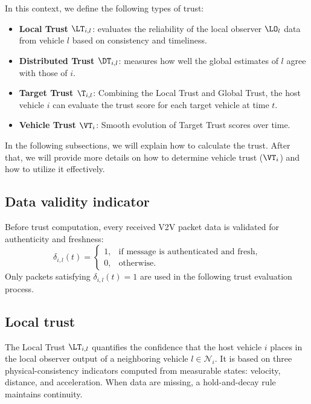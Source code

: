 In this context, we define the following types of trust:
\begin{itemize}
    \item \textbf{Local Trust $\LT_{i,l}$}: evaluates the reliability of the local observer $\LO_{l}$ data from vehicle $l$ based on consistency and timeliness.
    \item \textbf{Distributed Trust $\DT_{i,l}$}: measures how well the global estimates of $l$ agree with those of $i$.
    \item \textbf{Target Trust $\T_{i,l}$}: Combining the Local Trust and Global Trust,  the host vehicle $i$ can evaluate the trust score for each target vehicle at time $t$.
    \item \textbf{Vehicle Trust $\VT_{i}$}: Smooth evolution of Target Trust scores over time.
\end{itemize}

In the following subsections, we will explain how to calculate the trust. After that, we will provide more details on how to determine vehicle trust ($\VT_{i}$) and how to utilize it effectively.
\vspace*{-0.3cm}
\subsection{Data validity indicator}
\vspace*{-0.3cm}

Before trust computation, every received V2V packet data is validated for authenticity and freshness:
\begin{equation}
    \delta_{i,l}(t)=
    \begin{cases}
        1, & \text{if message}\text{ is authenticated and fresh}, \\
        0, & \text{otherwise.}
    \end{cases}
\end{equation}
Only packets satisfying $\delta_{i,l}(t)=1$ are used in the following trust evaluation process.

\vspace*{-0.3cm}
\subsection{Local trust}\label{sub:local_trust}
\vspace*{-0.3cm}

The Local Trust $\LT_{i,l}$ quantifies the confidence that the host vehicle $i$ places in the local observer output of a neighboring vehicle $l \in \mathcal N_i$. 
It is based on three physical-consistency indicators computed from measurable states: velocity, distance, and acceleration. When data are missing, a hold-and-decay rule maintains continuity.


